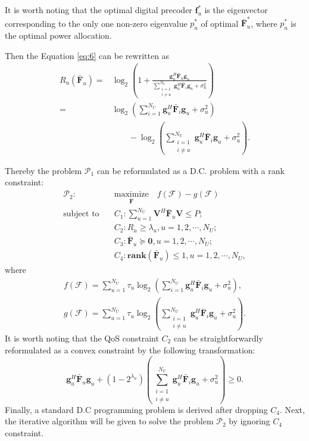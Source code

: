 \documentclass[10pt,journal,twocolumn,twoside]{IEEEtran}
\begin{document}
It is worth noting that the optimal digital precoder $\bm{f}_{u}^*$ is the eigenvector corresponding to the only one non-zero eigenvalue $p^*_u$ of optimal $\bar{\bm{F}}_u^*$, where $p^*_u$ is the optimal power allocation.

Then the Equation \eqref{eq:6} can be rewritten as
\begin{align}\label{eq:newR}
R_u(\bar{\bm{F}}_u) =& \log_2\left(1+\frac{\bm{g}_{u}^H \bar{\bm{F}}_u\bm{g}_{u}}{\sum_{\substack{i=1 \\ i\neq u}}^{N_U}{\bm{g}}_{u}^H\bar{\bm{F}}_i\bm{g}_u+\sigma_u^2}\right)\nonumber\\
=&\log_2\left(\sum_{i=1}^{N_U}\bm{g}_{u}^H \bar{\bm{F}}_i\bm{g}_{u} + \sigma_u^2\right) \nonumber\\
&\qquad -\log_2\left(\sum_{\substack{i=1 \\ i\neq u}}^{N_U}{\bm{g}}_{u}^H\bar{\bm{F}}_i\bm{g}_u+\sigma_u^2 \right).
\end{align}

Thereby the problem $\mathcal{P}_1$ can be reformulated as a D.C. problem with a rank constraint:
\begin{align}\label{eq:maxR}
\mathcal{P}_2: \quad&\underset{\bar{\bm{F}}}{\text{maximize}}\quad f(\bm{\mathcal{F}}) - g(\bm{\mathcal{F}})\\ \nonumber
\text{subject to} \quad&C_1: \sum_{u=1}^{N_U}\bm{V}^H \bar{\bm{F}}_u\bm{V} \leq P;\nonumber\\
&C_2: R_{u}\geq \lambda_{u}, u = 1,2,\cdots, N_U;\nonumber\\
&C_3: \bar{\bm{F}}_{u} \succeq \bm{0}, u = 1,2,\cdots, N_U; \nonumber\\
&C_4: \textbf{rank}(\bm{\bar{F}}_{u})\leq 1, u = 1,2,\cdots, N_U, \nonumber
\end{align}
where
\begin{align}
	f(\bm{\mathcal{F}}) = \sum_{u=1}^{N_U}\tau_u\log_2\left(\sum_{i=1}^{N_U}\bm{g}_{u}^H \bar{\bm{F}}_i\bm{g}_{u} + \sigma_u^2\right),\\
    g(\bm{\mathcal{F}}) = \sum_{u=1}^{N_U}\tau_u \log_2\left(\sum_{\substack{i=1 \\ i\neq u}}^{N_U}{\bm{g}}_{u}^H\bar{\bm{F}}_i\bm{g}_u+\sigma_u^2 \right).
\end{align}
It is worth noting that the QoS constraint $C_2$ can be straightforwardly reformulated as a convex constraint by the following transformation:
\begin{equation}
	\bm{g}_{u}^H \bar{\bm{F}}_u\bm{g}_{u} + (1-2^{\lambda_{u}}) \left( \sum_{\substack{i=1 \\ i\neq u}}^{N_U} \bm{g}_{u}^H \bar{\bm{F}}_i\bm{g}_{u} + \sigma_u^2 \right) \geq 0.
\end{equation}
Finally, a standard D.C programming problem is derived after dropping $C_4$. Next, the iterative algorithm will be given to solve the problem $\mathcal{P}_2$ by ignoring $C_4$ constraint.
\end{document}
